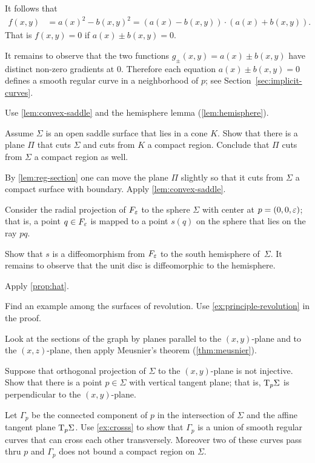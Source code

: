 It follows that 
\begin{align*}
f(x,y)&=a(x)^2-b(x,y)^2=
(a(x)-b(x,y))\cdot (a(x)+b(x,y)).
\end{align*}
That is $f(x,y)=0$ if $a(x)\pm b(x,y) =0$.

It remains to observe that the two functions $g_\pm(x,y)=a(x)\pm b(x,y)$ have distinct non-zero gradients at $0$.
Therefore each equation $a(x)\pm b(x,y) =0$ defines a smooth regular curve in a neighborhood of $p$;
see Section~\ref{sec:implicit-curves}.





 Use \ref{lem:convex-saddle} and the hemisphere lemma (\ref{lem:hemisphere}).

Assume $\Sigma$ is an open saddle surface that lies in a cone $K$.
Show that there is a plane $\Pi$ that cuts $\Sigma$ and cuts from $K$ a compact region.
Conclude that $\Pi$ cuts from $\Sigma$ a compact region as well.

By \ref{lem:reg-section} one can move the plane $\Pi$ slightly so that it cuts from $\Sigma$ a compact surface with boundary.
Apply \ref{lem:convex-saddle}.


Consider the radial projection of $F_\varepsilon$ to the sphere $\Sigma$ with center at $p=(0,0,\varepsilon)$;
that is, a point $q\in F_\varepsilon$ is mapped to a point $s(q)$ on the sphere that lies on the ray $pq$.

Show that $s$ is a diffeomorphism from $F_\varepsilon$ to the south hemisphere of~$\Sigma$.
It remains to observe that the  unit disc is diffeomorphic to the hemisphere.

 Apply \ref{prop:hat}.


Find an example among the surfaces of revolution.
Use \ref{ex:principle-revolution} in the proof.

 Look at the sections of the graph by planes parallel to the $(x,y)$-plane and to the $(x,z)$-plane, then apply Meusnier’s theorem (\ref{thm:meusnier}).

Suppose that orthogonal projection of $\Sigma$ to the $(x,y)$-plane is not injective.
Show that there is a point $p\in\Sigma$ with vertical tangent plane;
that is, $\mathrm{T}_p\Sigma$ is perpendicular to the $(x,y)$-plane.

Let $\Gamma_p$ be the connected component of $p$ in the intersection of $\Sigma$ and the affine tangent plane $\mathrm{T}_p\Sigma$.
Use \ref{ex:crosss} to show that $\Gamma_p$ is a union of smooth regular curves that can cross each other transversely.
Moreover two of these curves pass thru $p$ and $\Gamma_p$ does not bound a compact region on $\Sigma$.

